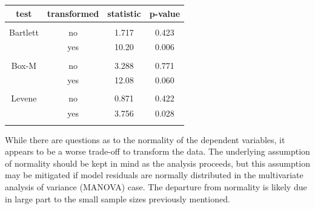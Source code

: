 \begin{center}
	\begin{tabular}{| c | c  c  c |}
	\hline
	test & transformed & statistic & p-value \\
	\hline
	&&&\\
	Bartlett & no & 1.717 & 0.423 \\
	& yes & 10.20 & 0.006 \\
	&&&\\
	Box-M & no & 3.288 & 0.771 \\
	& yes & 12.08 & 0.060 \\
	&&&\\
	Levene & no & 0.871 & 0.422 \\
	& yes & 3.756 &  0.028 \\
	&&&\\
	\hline
\end{tabular}
\end{center}

	While there are questions as to the normality of the dependent variables, it appears to be a worse trade-off to transform the data. The underlying assumption of normality should be kept in mind as the analysis proceeds, but this assumption may be mitigated if model residuals are normally distributed in the multivariate analysis of variance (MANOVA) case. The departure from normality is likely due in large part to the small sample sizes previously mentioned.

